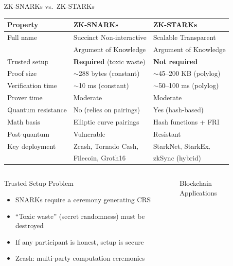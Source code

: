 \documentclass[8pt,aspectratio=169]{beamer}
\begin{document}
\begin{frame}{ZK-SNARKs vs.\ ZK-STARKs}
\begin{center}
\small
\begin{tabular}{lll}
\toprule
\textbf{Property} & \textbf{ZK-SNARKs} & \textbf{ZK-STARKs} \\
\midrule
Full name & Succinct Non-interactive & Scalable Transparent \\
 & Argument of Knowledge & Argument of Knowledge \\
Trusted setup & \textcolor{mlred}{\textbf{Required}} (toxic waste) & \textcolor{mlgreen}{\textbf{Not required}} \\
Proof size & \textcolor{mlgreen}{$\sim$288 bytes (constant)} & $\sim$45--200 KB (polylog) \\
Verification time & \textcolor{mlgreen}{$\sim$10 ms (constant)} & $\sim$50--100 ms (polylog) \\
Prover time & Moderate & Moderate \\
Quantum resistance & \textcolor{mlred}{No} (relies on pairings) & \textcolor{mlgreen}{Yes} (hash-based) \\
Math basis & Elliptic curve pairings & Hash functions + FRI \\
Post-quantum & \textcolor{mlred}{Vulnerable} & \textcolor{mlgreen}{Resistant} \\
\midrule
Key deployment & Zcash, Tornado Cash, & StarkNet, StarkEx, \\
 & Filecoin, Groth16 & zkSync (hybrid) \\
\bottomrule
\end{tabular}
\end{center}
\vspace{2mm}
\begin{columns}
\begin{block}{Trusted Setup Problem}
\begin{itemize}\small
  \item SNARKs require a ceremony generating CRS
  \item ``Toxic waste'' (secret randomness) must be destroyed
  \item If any participant is honest, setup is secure
  \item Zcash: multi-party computation ceremonies
\end{itemize}
\end{block}
\begin{block}{Blockchain Applications}

\end{block}
\end{columns}
\end{frame}
\end{document}
